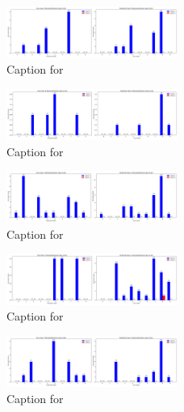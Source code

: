 \documentclass[12pt, a4paper]{article}
\begin{document}
\begin{figure}[ht]
\centering
\includegraphics[width=0.5\textwidth]{combined_class_boundary_pgd/combined_class_9_misclassifications_eps_0.01.png}
\caption{Caption for }
\label{fig:combined_class_9_misclassifications_eps_0.01.png}
\end{figure}

\begin{figure}[ht]
\centering
\includegraphics[width=0.5\textwidth]{combined_class_boundary_pgd/combined_class_0_misclassifications_eps_0.02.png}
\caption{Caption for }
\label{fig:combined_class_0_misclassifications_eps_0.02.png}
\end{figure}

\begin{figure}[ht]
\centering
\includegraphics[width=0.5\textwidth]{combined_class_boundary_pgd/combined_class_2_misclassifications_eps_0.02.png}
\caption{Caption for }
\label{fig:combined_class_2_misclassifications_eps_0.02.png}
\end{figure}

\begin{figure}[ht]
\centering
\includegraphics[width=0.5\textwidth]{combined_class_boundary_pgd/combined_class_1_misclassifications_eps_0.02.png}
\caption{Caption for }
\label{fig:combined_class_1_misclassifications_eps_0.02.png}
\end{figure}

\begin{figure}[ht]
\centering
\includegraphics[width=0.5\textwidth]{combined_class_boundary_pgd/combined_class_3_misclassifications_eps_0.02.png}
\caption{Caption for }
\label{fig:combined_class_3_misclassifications_eps_0.02.png}
\end{figure}
\end{document}
